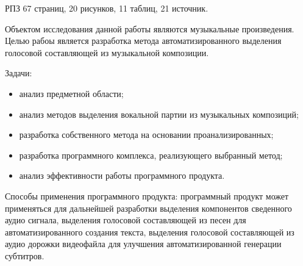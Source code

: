\Referat
РПЗ 67 страниц, 20 рисунков, 11 таблиц, 21 источник.

Объектом исследования данной работы являются музыкальные произведения.
Целью рабоы является разработка метода автоматизированного выделения голосовой составляющей из музыкальной композиции.

Задачи:

\begin{itemize}
	\item анализ предметной области;
	\item анализ методов выделения вокальной партии из музыкальных композиций;
	\item разработка собственного метода на основании проанализированных;
	\item разработка программного комплекса, реализующего выбранный метод;
	\item анализ эффективности работы программного продукта.
\end{itemize}

Способы применения программного продукта: программный продукт может применяться для дальнейшей разработки выделения компонентов сведенного аудио сигнала, выделения голосовой составляющей из песен для автоматизированного создания текста, выделения голосовой составляющей из аудио дорожки видеофайла для улучшения автоматизированной генерации субтитров. 

